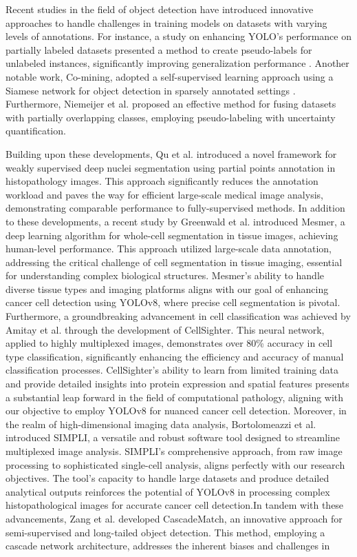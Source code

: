 \documentclass[anon]{midl} %
\begin{document}
Recent studies in the field of object detection have introduced innovative approaches to handle challenges in training models on datasets with varying levels of annotations. For instance, a study on enhancing YOLO's performance on partially labeled datasets presented a method to create pseudo-labels for unlabeled instances, significantly improving generalization performance \cite{abbasi2020self}. Another notable work, Co-mining, adopted a self-supervised learning approach using a Siamese network for object detection in sparsely annotated settings \cite{wang2021co}. Furthermore, Niemeijer et al. \cite{niemeijer2023approach} proposed an effective method for fusing datasets with partially overlapping classes, employing pseudo-labeling with uncertainty quantification.

Building upon these developments, Qu et al. \cite{qu2020weakly} introduced a novel framework for weakly supervised deep nuclei segmentation using partial points annotation in histopathology images. This approach significantly reduces the annotation workload and paves the way for efficient large-scale medical image analysis, demonstrating comparable performance to fully-supervised methods. In addition to these developments, a recent study by Greenwald et al. \cite{greenwald2022whole} introduced Mesmer, a deep learning algorithm for whole-cell segmentation in tissue images, achieving human-level performance. This approach utilized large-scale data annotation, addressing the critical challenge of cell segmentation in tissue imaging, essential for understanding complex biological structures. Mesmer's ability to handle diverse tissue types and imaging platforms aligns with our goal of enhancing cancer cell detection using YOLOv8, where precise cell segmentation is pivotal. Furthermore, a groundbreaking advancement in cell classification was achieved by Amitay et al. \cite{amitay2023cellsighter} through the development of CellSighter. This neural network, applied to highly multiplexed images, demonstrates over 80\% accuracy in cell type classification, significantly enhancing the efficiency and accuracy of manual classification processes. CellSighter’s ability to learn from limited training data and provide detailed insights into protein expression and spatial features presents a substantial leap forward in the field of computational pathology, aligning with our objective to employ YOLOv8 for nuanced cancer cell detection. Moreover, in the realm of high-dimensional imaging data analysis, Bortolomeazzi et al. \cite{bortolomeazzi2022simpli} introduced SIMPLI, a versatile and robust software tool designed to streamline multiplexed image analysis. SIMPLI's comprehensive approach, from raw image processing to sophisticated single-cell analysis, aligns perfectly with our research objectives. The tool's capacity to handle large datasets and produce detailed analytical outputs reinforces the potential of YOLOv8 in processing complex histopathological images for accurate cancer cell detection.In tandem with these advancements, Zang et al. \cite{zang2023semi} developed CascadeMatch, an innovative approach for semi-supervised and long-tailed object detection. This method, employing a cascade network architecture, addresses the inherent biases and challenges in 
\end{document}
